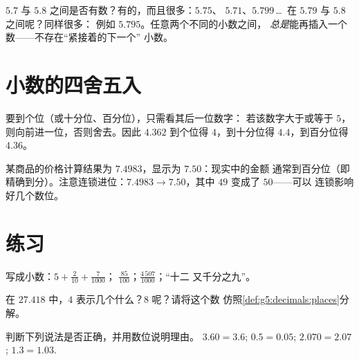 \begin{example}[在两个小数之间插入新数]\label{ex:g5:decimals:between}
$5.7$ 与 $5.8$ 之间是否有数？有的，而且很多：$5.75$、
$5.71$、$5.799$\,\dots\ 在 $5.79$ 与 $5.8$ 之间呢？同样很多：
例如 $5.795$。任意两个不同的小数之间，
\emph{总是}能再插入一个数——不存在“紧接着的下一个”
小数。
\end{example}

\section{小数的四舍五入}

\begin{definition}[四舍五入]\label{def:g5:decimals:round}
要到个位（或十分位、百分位），只需看其后一位数字：
若该数字大于或等于 $5$，则向前进一位，否则舍去。因此 $4.362$
到个位得 $4$，到十分位得 $4.4$，到百分位得 $4.36$。
\end{definition}

\begin{example}[钱款精确到分]\label{ex:g5:decimals:money}
某商品的价格计算结果为 $7.4983$，显示为 $7.50$：现实中的金额
通常到百分位（即精确到分）。注意连锁进位：$7.4983 \to
7.50$，其中 $49$ 变成了 $50$——可以
连锁影响好几个数位。
\end{example}

\section{练习}

\begin{exercise}[$\star$]\label{exo:g5:decimals:1}
写成小数：$5 + \frac{2}{10} + \frac{7}{1000}$；
\quad $\frac{85}{100}$；\quad $\frac{4\,507}{1000}$；\quad “十二
又千分之九”。
\end{exercise}

\begin{exercise}[$\star$]\label{exo:g5:decimals:2}
在 $27.418$ 中，$4$ 表示几个什么？$8$ 呢？请将这个数
仿照\cref{def:g5:decimals:places}分解。
\end{exercise}

\begin{exercise}[$\star$]\label{exo:g5:decimals:3}
判断下列说法是否正确，并用数位说明理由。
$3.60 = 3.6$; \quad $0.5 = 0.05$; \quad $2.070 = 2.07$; \quad
$1.3 = 1.03$.
\end{exercise}

